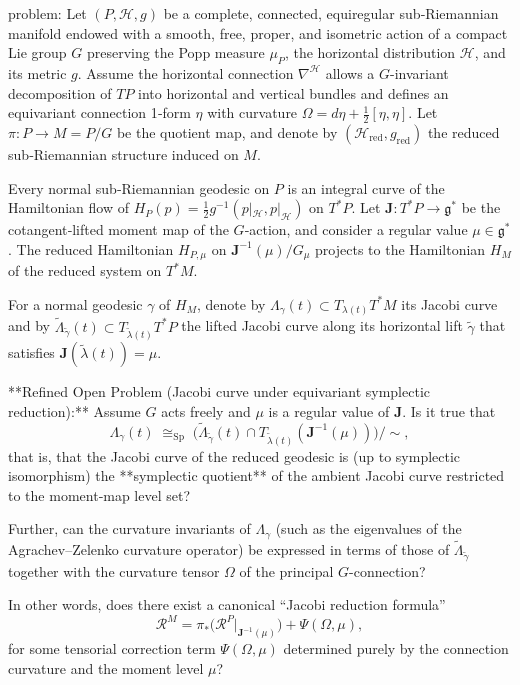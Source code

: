 problem:  
Let \((P,\mathcal{H},g)\) be a complete, connected, equiregular sub‑Riemannian manifold endowed with a smooth, free, proper, and isometric action of a compact Lie group \(G\) preserving the Popp measure \(\mu_P\), the horizontal distribution \(\mathcal{H}\), and its metric \(g\). Assume the horizontal connection \(\nabla^{\mathcal{H}}\) allows a \(G\)-invariant decomposition of \(TP\) into horizontal and vertical bundles and defines an equivariant connection 1‑form \(\eta\) with curvature \(\Omega=d\eta+ \frac12[\eta,\eta]\).  
Let \(\pi:P\to M=P/G\) be the quotient map, and denote by \((\mathcal{H}_{\mathrm{red}},g_{\mathrm{red}})\) the reduced sub‑Riemannian structure induced on \(M\).

Every normal sub‑Riemannian geodesic on \(P\) is an integral curve of the Hamiltonian flow of \(H_P(p)=\tfrac12 g^{-1}(p|_{\mathcal{H}},p|_{\mathcal{H}})\) on \(T^*P\).  Let \(\mathbf{J}:T^*P\to \mathfrak{g}^*\) be the cotangent‑lifted moment map of the \(G\)‑action, and consider a regular value \(\mu\in\mathfrak{g}^*\).  The reduced Hamiltonian \(H_{P,\mu}\) on \(\mathbf{J}^{-1}(\mu)/G_\mu\) projects to the Hamiltonian \(H_M\) of the reduced system on \(T^*M\).  

For a normal geodesic \(\gamma\) of \(H_M\), denote by \(\Lambda_\gamma(t)\subset T_{\lambda(t)}T^*M\) its Jacobi curve and by \(\tilde\Lambda_{\tilde\gamma}(t)\subset T_{\tilde\lambda(t)}T^*P\) the lifted Jacobi curve along its horizontal lift \(\tilde\gamma\) that satisfies \(\mathbf{J}(\tilde\lambda(t))=\mu\).

**Refined Open Problem (Jacobi curve under equivariant symplectic reduction):**  
Assume \(G\) acts freely and \(\mu\) is a regular value of \(\mathbf{J}\).  
Is it true that
\[
\Lambda_\gamma(t) \;\cong_{\mathrm{Sp}}\; 
\bigl(\tilde\Lambda_{\tilde\gamma}(t) \cap T_{\tilde\lambda(t)}(\mathbf{J}^{-1}(\mu))\bigr)\big/\!\!\sim,
\]
that is, that the Jacobi curve of the reduced geodesic is (up to symplectic isomorphism) the **symplectic quotient** of the ambient Jacobi curve restricted to the moment‑map level set?  

Further, can the curvature invariants of \(\Lambda_\gamma\) (such as the eigenvalues of the Agrachev–Zelenko curvature operator) be expressed in terms of those of \(\tilde\Lambda_{\tilde\gamma}\) together with the curvature tensor \(\Omega\) of the principal \(G\)-connection?

In other words, does there exist a canonical “Jacobi reduction formula”
\[
\mathcal{R}^M = \pi_*\!\big(\mathcal{R}^P|_{\mathbf{J}^{-1}(\mu)}\big) + \Psi(\Omega,\mu),
\]
for some tensorial correction term \(\Psi(\Omega,\mu)\) determined purely by the connection curvature and the moment level \(\mu\)?  


